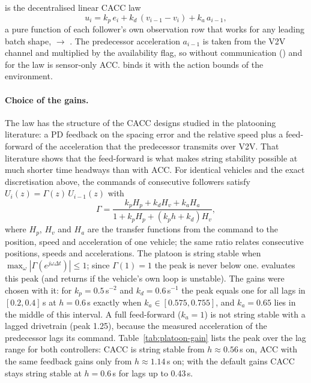  is the decentralised linear CACC law
\begin{equation}
  u_i = k_p\, e_i + k_d\, (v_{i-1} - v_i) + k_a\, a_{i-1},
  \label{eq:platoon-cacc}
\end{equation}
a pure function of each follower's own observation row that works for any
leading batch shape,  $\to$ . The predecessor
acceleration $a_{i-1}$ is taken from the V2V channel and multiplied by the
availability flag, so without communication () and for
 the law is sensor-only ACC. 
binds it with the action bounds of the environment.

\paragraph{Choice of the gains.} The law has the structure of the CACC designs
studied in the platooning literature: a PD feedback on the spacing error and
the relative speed plus a feed-forward of the acceleration that the predecessor
transmits over V2V. That literature shows that the feed-forward is what makes
string stability possible at much shorter time headways than with ACC. For
identical vehicles and the exact discretisation above, the commands of
consecutive followers satisfy $U_i(z) = \Gamma(z)\, U_{i-1}(z)$ with
\begin{equation}
  \Gamma = \frac{k_p H_p + k_d H_v + k_a H_a}{1 + k_p H_p + (k_p h + k_d) H_v},
  \label{eq:platoon-string}
\end{equation}
where $H_p$, $H_v$ and $H_a$ are the transfer functions from the command to the
position, speed and acceleration of one vehicle; the same ratio relates
consecutive positions, speeds and accelerations. The platoon is string stable
when $\max_\omega |\Gamma(e^{j\omega\Delta t})| \le 1$; since $\Gamma(1) = 1$ the
peak is never below one.  evaluates this peak (and returns  if the
vehicle's own loop is unstable). The gains were chosen with it: for
$k_p = 0.5$\,s$^{-2}$ and $k_d = 0.6$\,s$^{-1}$ the peak equals one for all lags
in $[0.2, 0.4]$\,s at $h = 0.6$\,s exactly when $k_a \in [0.575, 0.755]$, and
$k_a = 0.65$ lies in the middle of this interval. A full feed-forward
($k_a = 1$) is not string stable with a lagged drivetrain (peak 1.25), because
the measured acceleration of the predecessor lags its command.
Table~\ref{tab:platoon-gain} lists the peak over the lag range for both
controllers: CACC is string stable from $h \approx 0.56$\,s on, ACC with the
same feedback gains only from $h \approx 1.14$\,s on; with the default gains
CACC stays string stable at $h = 0.6$\,s for lags up to 0.43\,s.

